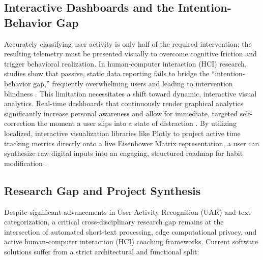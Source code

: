 \documentclass[conference]{IEEEtran}
\begin{document}
\subsection{Interactive Dashboards and the Intention-Behavior Gap}
Accurately classifying user activity is only half of the required intervention; the resulting telemetry must be presented visually to overcome cognitive friction and trigger behavioral realization. In human-computer interaction (HCI) research, studies show that passive, static data reporting fails to bridge the ``intention-behavior gap,'' frequently overwhelming users and leading to intervention blindness \cite{Dong2025, DongDesign2025}. This limitation necessitates a shift toward dynamic, interactive visual analytics. Real-time dashboards that continuously render graphical analytics significantly increase personal awareness and allow for immediate, targeted self-correction the moment a user slips into a state of distraction \cite{Narechania2021, Hasnine2023}. By utilizing localized, interactive visualization libraries like Plotly to project active time tracking metrics directly onto a live Eisenhower Matrix representation, a user can synthesize raw digital inputs into an engaging, structured roadmap for habit modification \cite{Abhari2022}.

\subsection{Research Gap and Project Synthesis}
Despite significant advancements in User Activity Recognition (UAR) and text categorization, a critical cross-disciplinary research gap remains at the intersection of automated short-text processing, edge computational privacy, and active human-computer interaction (HCI) coaching frameworks. Current software solutions suffer from a strict architectural and functional split:
\end{document}
